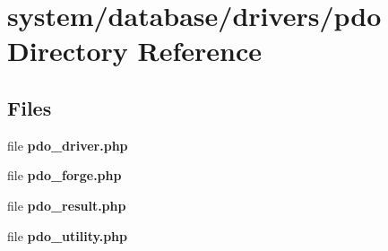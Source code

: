 \section{system/database/drivers/pdo Directory Reference}
\label{dir_afc966ecfa4f8e779e8ed196616e6a0e}
\subsection*{Files}
\begin{DoxyCompactItemize}
\item 
file {\bf pdo\-\_\-driver.\-php}
\item 
file {\bf pdo\-\_\-forge.\-php}
\item 
file {\bf pdo\-\_\-result.\-php}
\item 
file {\bf pdo\-\_\-utility.\-php}
\end{DoxyCompactItemize}
